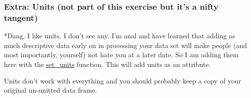 \documentclass[]{article}
\begin{document}
\hypertarget{extra-units-not-part-of-this-exercise-but-its-a-nifty-tangent}{%
\subsubsection{Extra: Units (not part of this exercise but it's a nifty
tangent)}\label{extra-units-not-part-of-this-exercise-but-its-a-nifty-tangent}}

*Dang. I like units. I don't see any. I'm anal and have learned that
adding as much descriptive data early on in processing your data set
will make people (and most importantly, yourself) not hate you at a
later date. So I am adding them here with the
\href{https://www.rdocumentation.org/packages/units/versions/0.6-0/topics/set_units}{set\_units}
function. This will add units as an attribute.

Units don't work with everything and you should probably keep a copy of
your original un-unitted data frame.
\end{document}
